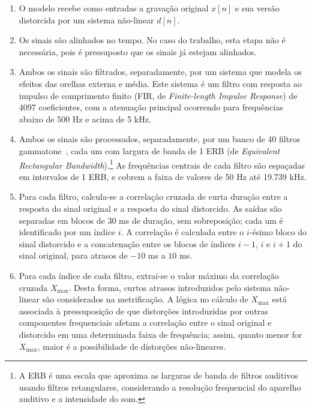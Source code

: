 \begin{enumerate}
	\item O modelo recebe como entradas a gravação original $x[n]$ e sua versão distorcida por um
	      sistema não-linear $d[n]$.

	\item Os sinais são alinhados no tempo. No caso do trabalho, esta etapa não é necessária,
	      pois é pressuposto que os sinais já estejam alinhados.

	\item Ambos os sinais são filtrados, separadamente, por um sistema que modela os efeitos das
	      orelhas externa e média. Este sistema é um filtro com resposta ao impulso de
	      comprimento finito (FIR, de \textit{Finite-length Impulse
		      Response}) de 4097 coeficientes,
	      com a atenuação principal ocorrendo para frequências abaixo de 500 Hz e acima de 5 kHz.

	\item Ambos os sinais são processados, separadamente, por um banco de 40 filtros
	      gammatone~\cite{slaney-1993}, cada um com largura de banda de 1 ERB (de
	      \textit{Equivalent Rectangular Bandwidth}).\footnote{A ERB é uma escala que aproxima as larguras de banda de filtros
		      auditivos usando filtros retangulares, considerando a resolução frequencial do aparelho
		      auditivo e a intensidade do som.} As frequências centrais de cada filtro são espaçadas
	      em intervalos de 1 ERB, e cobrem a faixa de valores de 50 Hz até 19.739 kHz.

	\item Para cada filtro, calcula-se a correlação cruzada de curta duração entre a resposta do
	      sinal original e a resposta do sinal distorcido. As saídas são separadas em blocos de
	      30 ms de duração, sem sobreposição; cada um é identificado por um índice $i$. A
	      correlação é calculada entre o $i$-ésimo bloco do sinal distorcido e a concatenação
	      entre os blocos de índices $i-1$, $i$ e $i+1$ do sinal original, para atrasos de $-10$
	      ms a $10$ ms.

	\item Para cada índice de cada filtro, extrai-se o valor máximo da correlação cruzada
	      $X_{\max}$. Desta forma, curtos atrasos introduzidos pelo sistema não-linear são
	      considerados na metrificação. A lógica no cálculo de $X_{\max}$ está associada à
	      pressuposição de que distorções introduzidas por outras componentes frequenciais afetam
	      a correlação entre o sinal original e distorcido em uma determinada faixa de
	      frequência; assim, quanto menor for $X_{\max}$, maior é a possibilidade de distorções
	      não-lineares.


\end{enumerate}
